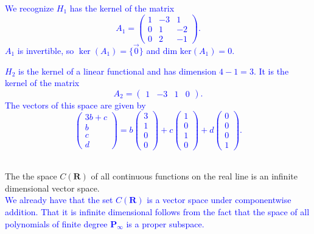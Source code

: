 \documentclass[a4paper,11pt]{article}
\newcommand{\R}{\mathbf{R}}
\newcommand{\PP}{\mathbf{P}}
\newcommand{\blue}[1]{\textcolor{blue}{#1}}
\begin{document}
\blue{We recognize $H_1$ has the kernel of the matrix
  \[
    A_1=
    \left(
      \begin{array}{rrr}
        1 & -3 & 1 \\ 0 & 1 & -2 \\ 0 & 2 & -1
      \end{array}
    \right).
  \]
  $A_1$ is invertible, so $\ker(A_1)=\{\vec 0\}$ and $\text{dim ker}(A_1)=0$.}

\blue{$H_2$ is the kernel of a linear functional and has dimension $4-1=3$. It
  is the kernel of the matrix
  \[
    A_2 = \begin{pmatrix}
            1 & -3 & 1 & 0
          \end{pmatrix}.
  \]
  The vectors of this space are given by
  \[
    \left(
      \begin{array}{c}
        3b+c \\ b \\ c \\ d
      \end{array}
    \right)
    =b
    \left(
      \begin{array}{r}
        3 \\ 1 \\ 0 \\ 0
      \end{array}
    \right)
    +c
    \left(
      \begin{array}{r}
        1 \\ 0 \\ 1 \\ 0
      \end{array}
    \right)
    +d
    \left(
      \begin{array}{r}
        0 \\ 0 \\ 0 \\ 1
      \end{array}
    \right).
  \] \\}

 The the space $C(\R)$ of all continuous functions
on the real line is an infinite dimensional vector space. \\

\blue{We already have that the set $C(\R)$ is a vector space under componentwise
addition. That it is infinite dimensional follows from the fact that the space
of all polynomials of finite degree $\PP_\infty$ is a proper subspace. \\}
\end{document}
